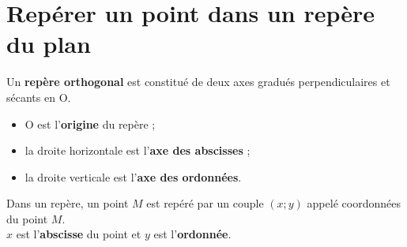 \cours 

\section{Repérer un point dans un repère du plan}

\begin{definition}  
   Un \textbf{repère orthogonal} est constitué de deux axes gradués perpendiculaires et sécants en O.
    \begin{itemize}
      \item O est l'\textbf{origine} du repère ;
      \item la droite horizontale est l'\textbf{axe des abscisses} ;
      \item la droite verticale est l'\textbf{axe des ordonnées}.
   \end{itemize} 
\end{definition}

\medskip

\begin{propriete}
   Dans un repère, un point $M$ est repéré par un couple $(x;y)$ appelé coordonnées du point $M$. \\
   $x$ est l'\textbf{abscisse} du point et $y$ est l'\textbf{ordonnée}.
\end{propriete}

